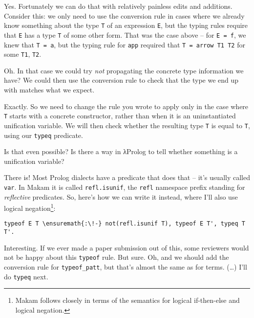 \heroADVISOR{} Yes. Fortunately we can do that with relatively painless edits
and additions. Consider this: we only need to use the conversion rule in
cases where we already know something about the type \texttt{T} of an
expression \texttt{E}, but the typing rules require that \texttt{E} has
a type \texttt{T\textquotesingle{}} of some other form. That was the
case above -- for \texttt{E\ =\ f}, we knew that \texttt{T\ =\ a}, but
the typing rule for \texttt{app} required that
\texttt{T\textquotesingle{}\ =\ arrow\ T1\ T2} for some \texttt{T1},
\texttt{T2}.

\heroSTUDENT{} Oh. In that case we could try \emph{not} propagating the
concrete type information we have? We could then use the conversion rule
to check that the type we end up with matches what we expect.

\heroADVISOR{} Exactly. So we need to change the rule you wrote to apply only
in the case where \texttt{T} starts with a concrete constructor, rather
than when it is an uninstantiated unification variable. We will then
check whether the resulting type \texttt{T\textquotesingle{}} is equal
to \texttt{T}, using our \texttt{typeq} predicate.

\heroSTUDENT{} Is that even possible? Is there a way in \foreignlanguage{greek}{λ}Prolog to tell
whether something is a unification variable?

\heroADVISOR{} There is! Most Prolog dialects have a predicate that does that
-- it's usually called \texttt{var}. In Makam it is called
\texttt{refl.isunif}, the \texttt{refl} namespace prefix standing for
\emph{reflective} predicates. So, here's how we can write it instead,
where I'll also use logical
negation\footnote{Makam follows \citet{kiselyov05backtracking} closely in terms of the semantics for logical if-then-else and logical negation.}:

\importantCodeblock{}

\begin{verbatim}
typeof E T \ensuremath{:\!-} not(refl.isunif T), typeof E T', typeq T T'.
\end{verbatim}

\importantCodeblockEnd{}

\heroSTUDENT{} Interesting. If we ever made a paper submission out of this,
some reviewers would not be happy about this \texttt{typeof} rule. But
sure. Oh, and we should add the conversion rule for
\texttt{typeof\_patt}, but that's almost the same as for terms.
(\ldots{}) I'll do \texttt{typeq} next.

